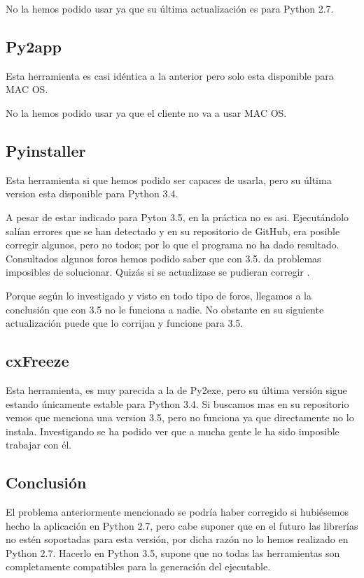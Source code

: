 No la hemos podido usar ya que su última actualización es para Python 2.7.

\subsection{Py2app}
Esta herramienta es casi idéntica a la anterior pero solo esta disponible para MAC OS.

No la hemos podido usar ya que el cliente no va a usar MAC OS.

\subsection{Pyinstaller}
Esta herramienta \cite{Pyinstaller} si que hemos podido ser capaces de usarla, pero su última version esta disponible para Python 3.4.

A pesar  de estar indicado para Pyton 3.5, en la práctica no es asi. Ejecutándolo salían errores que se han detectado y en su repositorio de GitHub, era posible corregir algunos, pero no todos; por lo que el programa no ha dado resultado. 
Consultados algunos foros hemos podido saber que con 3.5. da problemas imposibles de solucionar. Quizás si se actualizase se pudieran corregir . 

Porque según lo investigado y visto en todo tipo de foros, llegamos a la conclusión que con 3.5 no le funciona a nadie.
No obstante en su siguiente actualización puede que lo corrijan y funcione para 3.5.

\subsection{cxFreeze}
Esta herramienta, es muy parecida a la de Py2exe, pero su última versión sigue estando únicamente estable para Python 3.4. 
Si buscamos mas en su repositorio vemos que menciona una version 3.5, pero no funciona ya que directamente no lo instala. Investigando se ha podido ver que a mucha gente le ha sido imposible trabajar con él. 

\subsection{Conclusión}
El problema anteriormente mencionado se podría haber corregido si hubiésemos hecho la aplicación en Python 2.7, pero cabe suponer que en el futuro las librerías no estén soportadas para esta versión, por dicha razón no lo hemos realizado en Python 2.7.
Hacerlo en Python 3.5, supone que no todas las herramientas son completamente compatibles para la generación del ejecutable.

